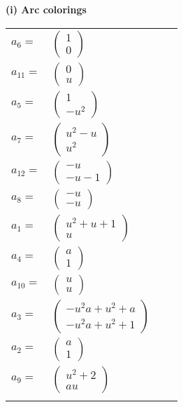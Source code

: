 \documentclass[1p]{elsarticle_modified}
\theoremstyle{definition}
\begin{document}
\flushleft \textbf{(i) Arc colorings}\\
\begin{tabular}{m{7pt} m{180pt} m{7pt} m{180pt} }
\flushright $a_{6}=$&$\begin{pmatrix}1\\0\end{pmatrix}$ \\
\flushright $a_{11}=$&$\begin{pmatrix}0\\u\end{pmatrix}$ \\
\flushright $a_{5}=$&$\begin{pmatrix}1\\- u^2\end{pmatrix}$ \\
\flushright $a_{7}=$&$\begin{pmatrix}u^2- u\\u^2\end{pmatrix}$ \\
\flushright $a_{12}=$&$\begin{pmatrix}- u\\- u-1\end{pmatrix}$ \\
\flushright $a_{8}=$&$\begin{pmatrix}- u\\- u\end{pmatrix}$ \\
\flushright $a_{1}=$&$\begin{pmatrix}u^2+u+1\\u\end{pmatrix}$ \\
\flushright $a_{4}=$&$\begin{pmatrix}a\\1\end{pmatrix}$ \\
\flushright $a_{10}=$&$\begin{pmatrix}u\\u\end{pmatrix}$ \\
\flushright $a_{3}=$&$\begin{pmatrix}- u^2 a+u^2+a\\- u^2 a+u^2+1\end{pmatrix}$ \\
\flushright $a_{2}=$&$\begin{pmatrix}a\\1\end{pmatrix}$ \\
\flushright $a_{9}=$&$\begin{pmatrix}u^2+2\\a u\end{pmatrix}$\\&\end{tabular}
\end{document}
